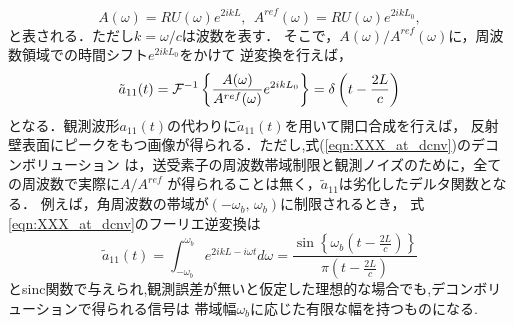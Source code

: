 \begin{equation}
	A(\omega) = RU(\omega) e^{2ik L},  \ \
	A^{ref}(\omega) = RU(\omega) e^{2ik L_0}, 
	\label{eqn:XXX_17}
\end{equation}
と表される．ただし$k=\omega/c$は波数を表す．
そこで，$A(\omega)/A^{ref}(\omega)$に，周波数領域での時間シフト$e^{2ikL_0}$をかけて
逆変換を行えば，
\begin{equation}
	\tilde a_{11}(t)= {\cal F}^{-1} \left\{ 
	\frac{A(\omega)}{A^{ref}(\omega)} e ^{2ik L_0}
	\right\}
	=\delta \left(t-\frac{2L}{c}\right)
	\label{eqn:XXX_at_dcnv}
\end{equation}
となる．観測波形$a_{11}(t)$の代わりに$\tilde a_{11}(t)$を用いて開口合成を行えば，
反射壁表面にピークをもつ画像が得られる．ただし,式(\ref{eqn:XXX_at_dcnv})のデコンボリューション
は，送受素子の周波数帯域制限と観測ノイズのために，全ての周波数で実際に$A/A^{ref}$
が得られることは無く，$\tilde a_{11}$は劣化したデルタ関数となる．
例えば，角周波数の帯域が$(-\omega_b,\, \omega_b)$に制限されるとき，
式\ref{eqn:XXX_at_dcnv}のフーリエ逆変換は
\begin{equation}
	\tilde a_{11}(t)= 
	\int_{-\omega_b}^{\omega_b} 
	e^{2ikL-i\omega t} d\omega 
	=\frac{\sin\left\{ \omega_b \left( t-\frac{2L}{c}\right)\right\}}{\pi \left(t-\frac{2L}{c}\right)}
	\label{eqn:XXX_18}
\end{equation}
とsinc関数で与えられ,観測誤差が無いと仮定した理想的な場合でも,デコンボリューションで得られる信号は
帯域幅$\omega_b$に応じた有限な幅を持つものになる.
